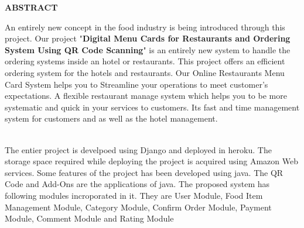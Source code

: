 \documentclass[12pt,a4paper]{report}
\renewcommand{\bibname}{\Large REFERENCES}
\begin{document}
\begin{center}
{\bf \Large {ABSTRACT}}
\end{center}
\vspace{30pt}
\begin{doublespace}
\par
An entirely new concept in the food industry is being introduced through this project. Our project "\textbf{Digital Menu Cards for Restaurants and Ordering System
Using QR Code Scanning}" is an entirely new system to handle the ordering systems inside an hotel or restaurants. This project offers an efficient ordering system for the hotels and restaurants. Our Online Restaurants Menu Card System helps you to Streamline your
operations to meet customer’s expectations.
A flexible restaurant manage system which helps you to be more systematic and
quick in your services to customers.
Its fast and time management system for customers and as well as the hotel management.
\\
\\
\par
The entier project is develpoed using Django and deployed in heroku. The storage space required while deploying the project is acquired using Amazon Web services. Some features of the project has been developed using java. The QR Code and Add-Ons are the applications of java. The proposed system has following modules incroporated in it. They are User Module, Food Item Management Module, Category Module, Confirm Order Module, Payment Module, Comment Module and Rating Module
\end{doublespace}

\newpage
{}
\listoftables
\newpage
{}
\listoffigures
\newpage
{}
\setcounter{page}{1}
\pagestyle{fancy}
\chead{}
\rhead{}
\cfoot{}
\rfoot{\thepage}
\renewcommand{\headrulewidth}{1pt}
\renewcommand{\footrulewidth}{1pt}
\renewcommand{\chaptername}{ \Large{CHAPTER}}
\chapterfont{\centering}
\renewcommand\bibname{REFERENCES}
\end{document}
